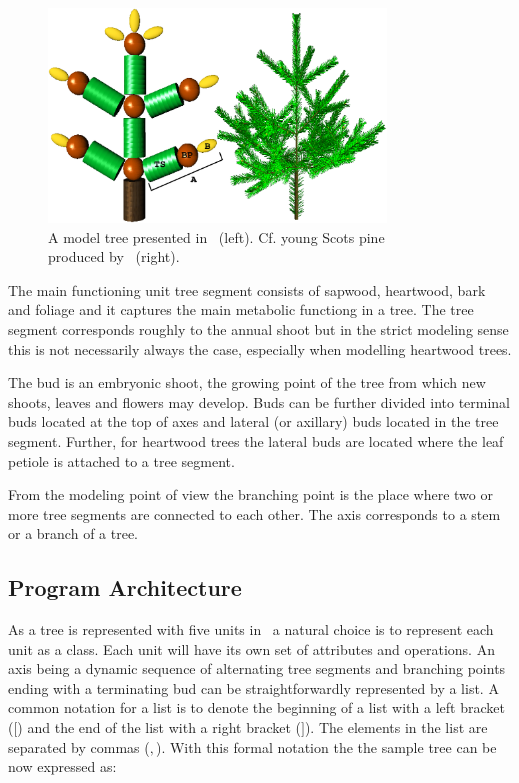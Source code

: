 \begin{figure}[h]
\begin{center}
\includegraphics[width=0.8\textwidth,height=0.5\textwidth]{Lignum3D.eps}
\caption{ A model tree presented in \lignum\
(left). Cf. young Scots pine\\produced by \lignum\ (right).}\label{fig:struct}
\end{center}
\end{figure}

The main functioning unit tree segment consists of sapwood, heartwood,
bark and  foliage and it  captures the main  metabolic functiong  in a
tree.  The tree segment corresponds roughly to the annual shoot but in
the   strict modeling sense this is   not necessarily always the case,
especially when modelling heartwood trees.

The bud is  an  embryonic shoot, the  growing  point of the tree  from
which new shoots, leaves and flowers may develop.  Buds can be further
divided  into terminal buds located at  the top of  axes and lateral
(or   axillary) buds  located   in the  tree   segment.  Further,  for
heartwood trees the lateral buds are located where the leaf petiole is
attached to a tree segment.

From the modeling point of view the branching point is the place where
two or more  tree  segments are  connected  to each other.   The  axis
corresponds to a stem or a branch of a tree.

\subsection{Program Architecture}

As a tree is represented with  five units in \lignum\ a natural choice
is to represent each unit as a class.  Each unit will have its own set
of attributes  and operations.   An axis being  a dynamic  sequence of
alternating  tree   segments  and  branching  points   ending  with  a
terminating  bud can be  straightforwardly represented  by a  list.  A
common notation for a list is to denote the beginning of a list with a
left  bracket ($[$)  and the  end  of the  list with  a right  bracket
($]$). The elements  in the list are separated  by commas ($,$).  With
this formal notation the the sample tree can be now expressed as:

